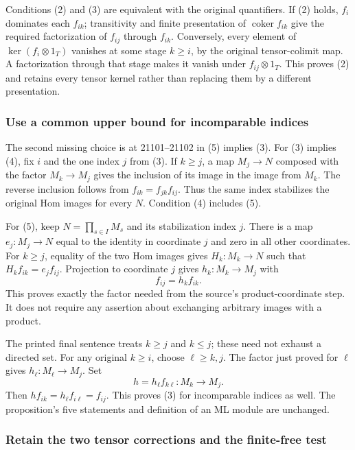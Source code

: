 Conditions (2) and (3) are equivalent with the original quantifiers. If (2) holds, \(f_i\) dominates each \(f_{ik}\); transitivity and finite presentation of \(\operatorname{coker}f_{ik}\) give the required factorization of \(f_{ij}\) through \(f_{ik}\). Conversely, every element of \(\ker(f_i\otimes1_T)\) vanishes at some stage \(k\geq i\), by the original tensor-colimit map. A factorization through that stage makes it vanish under \(f_{ij}\otimes1_T\). This proves (2) and retains every tensor kernel rather than replacing them by a different presentation.

\subsubsection{Use a common upper bound for incomparable indices}\label{use-a-common-upper-bound-for-incomparable-indices}

The second missing choice is at 21101--21102 in (5) implies (3). For (3) implies (4), fix \(i\) and the one index \(j\) from (3). If \(k\geq j\), a map \(M_j\to N\) composed with the factor \(M_k\to M_j\) gives the inclusion of its image in the image from \(M_k\). The reverse inclusion follows from \(f_{ik}=f_{jk}f_{ij}\). Thus the same index stabilizes the original Hom images for every \(N\). Condition (4) includes (5).

For (5), keep \(N=\prod_{s\in I}M_s\) and its stabilization index \(j\). There is a map \(e_j:M_j\to N\) equal to the identity in coordinate \(j\) and zero in all other coordinates. For \(k\geq j\), equality of the two Hom images gives \(H_k:M_k\to N\) such that \(H_k f_{ik}=e_j f_{ij}\). Projection to coordinate \(j\) gives \(h_k:M_k\to M_j\) with \[
f_{ij}=h_k f_{ik}.
\] This proves exactly the factor needed from the source's product-coordinate step. It does not require any assertion about exchanging arbitrary images with a product.

The printed final sentence treats \(k\geq j\) and \(k\leq j\); these need not exhaust a directed set. For any original \(k\geq i\), choose \(\ell\geq k,j\). The factor just proved for \(\ell\) gives \(h_\ell:M_\ell\to M_j\). Set \[
h=h_\ell f_{k\ell}:M_k\to M_j.
\] Then \(h f_{ik}=h_\ell f_{i\ell}=f_{ij}\). This proves (3) for incomparable indices as well. The proposition's five statements and definition of an ML module are unchanged.

\subsubsection{Retain the two tensor corrections and the finite-free test}\label{retain-the-two-tensor-corrections-and-the-finite-free-test}

